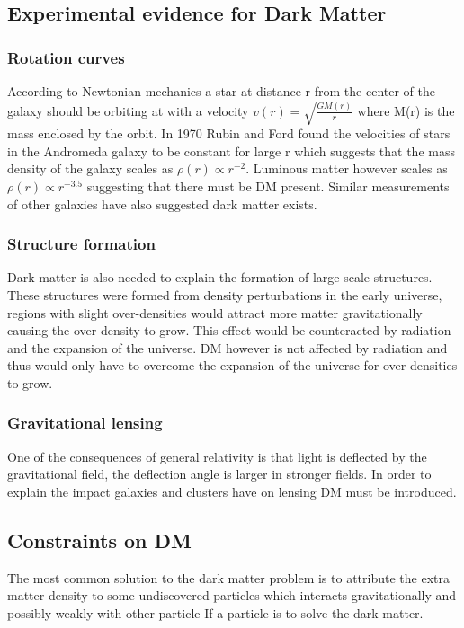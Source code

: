 \documentclass{article}
\begin{document}
\subsection{Experimental evidence for Dark Matter} 

\subsubsection*{Rotation curves} 
According to Newtonian mechanics a star at distance r from the center of the galaxy should be orbiting at with a velocity $v(r)=\sqrt{\frac{GM(r)}{r}}$ where M(r) is the mass enclosed by the orbit. 
 In 1970 \cite{rubin1970rotation} Rubin and Ford found the velocities of stars in the Andromeda galaxy to be constant for large r which suggests that the mass density of the galaxy scales as $\rho(r)\propto r^{-2}$. Luminous matter however scales as $\rho(r)\propto r^{-3.5}$ suggesting that there must be DM present. Similar measurements of other galaxies have also suggested dark matter exists.
 
\subsubsection*{Structure formation} 
 Dark matter is also needed to explain the formation of large scale structures. These structures were formed from density perturbations in the early universe, regions with slight over-densities would attract more matter gravitationally causing the over-density to grow. This effect would be counteracted by radiation  and the expansion of the universe. DM however is not affected by radiation and thus would only have to overcome the expansion of the universe for over-densities to grow. 
 
\subsubsection*{Gravitational lensing} 
One of the consequences of general relativity is that light is deflected by the gravitational field, the deflection angle is larger in stronger fields. In order to explain the impact galaxies and clusters have on lensing DM must be introduced.



\subsection{Constraints on DM}
The most common solution to the dark matter problem is to attribute the extra matter density to some undiscovered particles which interacts gravitationally and possibly weakly with other particle
If a particle is to solve the dark matter. 
\end{document}
